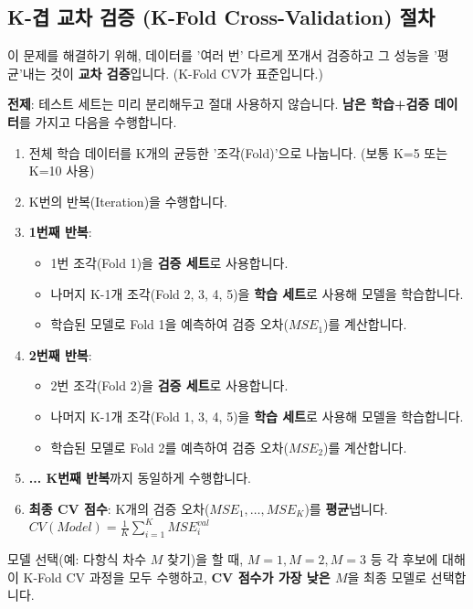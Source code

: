 \documentclass[11pt,a4paper]{book}
\theoremstyle{definition}
\begin{document}
\subsection{K-겹 교차 검증 (K-Fold Cross-Validation) 절차}

이 문제를 해결하기 위해, 데이터를 '여러 번' 다르게 쪼개서 검증하고 그 성능을 '평균'내는 것이 \textbf{교차 검증}입니다. (K-Fold CV가 표준입니다.)

\textbf{전제}: 테스트 세트는 미리 분리해두고 절대 사용하지 않습니다. \textbf{남은 학습+검증 데이터}를 가지고 다음을 수행합니다.

\begin{enumerate}
    \item 전체 학습 데이터를 K개의 균등한 '조각(Fold)'으로 나눕니다. (보통 K=5 또는 K=10 사용)
    \item K번의 반복(Iteration)을 수행합니다.
    \item \textbf{1번째 반복}:
        \begin{itemize}
            \item 1번 조각(Fold 1)을 \textbf{검증 세트}로 사용합니다.
            \item 나머지 K-1개 조각(Fold 2, 3, 4, 5)을 \textbf{학습 세트}로 사용해 모델을 학습합니다.
            \item 학습된 모델로 Fold 1을 예측하여 검증 오차($MSE_1$)를 계산합니다.
        \end{itemize}
    \item \textbf{2번째 반복}:
        \begin{itemize}
            \item 2번 조각(Fold 2)을 \textbf{검증 세트}로 사용합니다.
            \item 나머지 K-1개 조각(Fold 1, 3, 4, 5)을 \textbf{학습 세트}로 사용해 모델을 학습합니다.
            \item 학습된 모델로 Fold 2를 예측하여 검증 오차($MSE_2$)를 계산합니다.
        \end{itemize}
    \item \textbf{... K번째 반복}까지 동일하게 수행합니다.
    \item \textbf{최종 CV 점수}: K개의 검증 오차($MSE_1, \dots, MSE_K$)를 \textbf{평균}냅니다.
    $CV(Model) = \frac{1}{K} \sum_{i=1}^{K} MSE_i^{val}$
\end{enumerate}

모델 선택(예: 다항식 차수 $M$ 찾기)을 할 때, $M=1, M=2, M=3$ 등 각 후보에 대해 이 K-Fold CV 과정을 모두 수행하고, \textbf{CV 점수가 가장 낮은 $M$}을 최종 모델로 선택합니다.
\end{document}
